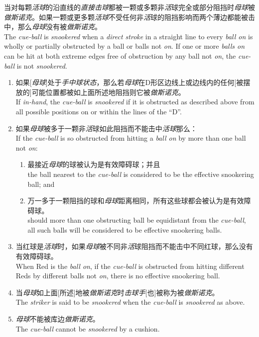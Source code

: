 \noindent 当对每颗\textit{活球}的沿直线的\textit{直接击球}都被一颗或多颗非\textit{活}球完全或部分阻挡时\textit{母球}被\textit{做斯诺克}。如果一颗或更多颗\textit{活球}不受任何非\textit{活}球的阻挡影响而两个薄边都能被击中，那么\textit{母球}没有被\textit{做斯诺克}。\\
The \textit{cue-ball} is \textit{snookered} when a \textit{direct stroke} in a straight line to every \textit{ball on} is wholly or partially obstructed by a ball or balls not \textit{on}. If one or more \textit{balls on} can be hit at both extreme edges free of obstruction by any ball not \textit{on}, the \textit{cue-ball} is not \textit{snookered}.
\begin{enumerate}[label=(\alph*)]
    \item 如果[\textit{母球}]处于\textit{手中球状态}，那么若\textit{母球}在D形区边线上或边线内的任何[被摆放的]可能位置都被如上面所述地阻挡则它被\textit{做斯诺克}。\\
    If \textit{in-hand}, the \textit{cue-ball} is \textit{snookered} if it is obstructed as described above from all possible positions on or within the lines of the ``D''.
    \item 如果\textit{母球}被多于一颗非\textit{活}球如此阻挡而不能击中\textit{活球}那么：\\
    If the \textit{cue-ball} is so obstructed from hitting a \textit{ball on} by more than one ball not \textit{on}:
    \begin{enumerate}[label=(\roman*)]
        \item 最接近\textit{母球}的球被认为是有效障碍球；并且\\
        the ball nearest to the \textit{cue-ball} is considered to be the effective snookering ball; and
        \item 万一多于一颗阻挡的球和\textit{母球}距离相同，所有这些球都会被认为是有效障碍球。\\
        should more than one obstructing ball be equidistant from the \textit{cue-ball}, all such balls will be considered to be effective snookering balls.
    \end{enumerate}
    \item 当红球是\textit{活球}时，如果\textit{母球}被不同非\textit{活}球阻挡而不能击中不同红球，那么没有有效障碍球。\\
    When Red is the \textit{ball on}, if the \textit{cue-ball} is obstructed from hitting different Reds by different balls not \textit{on}, there is no effective snookering ball.
    \item 当\textit{母球}如上面[所述]地被\textit{做斯诺克}时\textit{击球手}[也]被称为被\textit{做斯诺克}。\\
    The \textit{striker} is said to be \textit{snookered} when the \textit{cue-ball} is \textit{snookered} as above.
    \item \textit{母球}不能被库边\textit{做斯诺克}。\\
    The \textit{cue-ball} cannot be \textit{snookered} by a cushion.
\end{enumerate}

